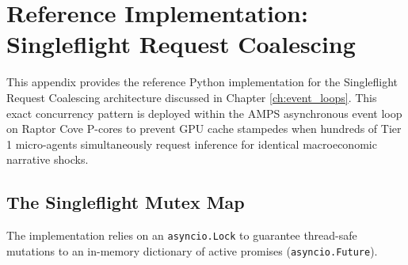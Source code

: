 \chapter{Reference Implementation: Singleflight Request Coalescing}
\label{app:reference_singleflight}

This appendix provides the reference Python implementation for the Singleflight Request Coalescing architecture \cite{fitzpatrick2018singleflight, vattani2015cache} discussed in Chapter \ref{ch:event_loops}. This exact concurrency pattern is deployed within the AMPS asynchronous event loop on Raptor Cove P-cores to prevent GPU cache stampedes when hundreds of Tier 1 micro-agents simultaneously request inference for identical macroeconomic narrative shocks.

\section{The Singleflight Mutex Map}

The implementation relies on an \texttt{asyncio.Lock} to guarantee thread-safe mutations to an in-memory dictionary of active promises (\texttt{asyncio.Future}).

\vspace{\baselineskip}

